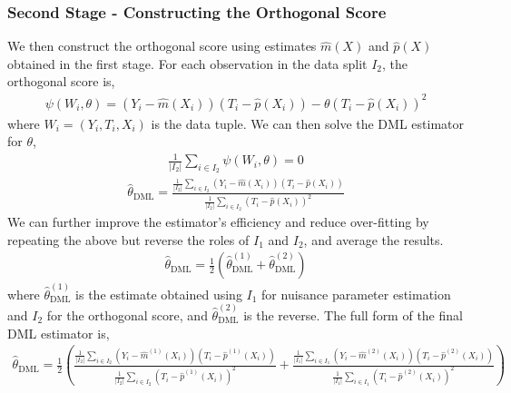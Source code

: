 \subsubsection{Second Stage - Constructing the Orthogonal Score}
We then construct the orthogonal score using estimates \(\hat{m}(X)\) and \(\hat{p}(X)\) obtained in the first stage. For each observation in the data split \(I_2\), the orthogonal score is,
\begin{align}
\psi(W_i, \theta) = (Y_i - \hat{m}(X_i)) (T_i - \hat{p}(X_i)) - \theta (T_i - \hat{p}(X_i))^2
\end{align}
where \(W_i = (Y_i, T_i, X_i)\) is the data tuple. We can then solve the DML estimator for \(\theta\),
\begin{align}
\frac{1}{|I_2|} \sum_{i \in I_2} \psi(W_i, \theta) = 0
\end{align}
\begin{align}
\hat{\theta}_{\text{DML}} = \frac{\frac{1}{|I_2|} \sum_{i \in I_2} (Y_i - \hat{m}(X_i))(T_i - \hat{p}(X_i))}{\frac{1}{|I_2|} \sum_{i \in I_2} (T_i - \hat{p}(X_i))^2}
\end{align}
We can further improve the estimator's efficiency and reduce over-fitting by repeating the above but reverse the roles of \(I_1\) and \(I_2\), and average the results.
\begin{align}
\hat{\theta}_{\text{DML}} = \frac{1}{2} \left( \hat{\theta}_{\text{DML}}^{(1)} + \hat{\theta}_{\text{DML}}^{(2)} \right)
\end{align}
where \(\hat{\theta}_{\text{DML}}^{(1)}\) is the estimate obtained using \(I_1\) for nuisance parameter estimation and \(I_2\) for the orthogonal score, and \(\hat{\theta}_{\text{DML}}^{(2)}\) is the reverse.
The full form of the final DML estimator is,
\begin{align}
\hat{\theta}_{\text{DML}} = \frac{1}{2} \left( \frac{\frac{1}{|I_2|} \sum_{i \in I_2} (Y_i - \hat{m}^{(1)}(X_i))(T_i - \hat{p}^{(1)}(X_i))}{\frac{1}{|I_2|} \sum_{i \in I_2} (T_i - \hat{p}^{(1)}(X_i))^2} + \frac{\frac{1}{|I_1|} \sum_{i \in I_1} (Y_i - \hat{m}^{(2)}(X_i))(T_i - \hat{p}^{(2)}(X_i))}{\frac{1}{|I_1|} \sum_{i \in I_1} (T_i - \hat{p}^{(2)}(X_i))^2} \right)
\end{align}